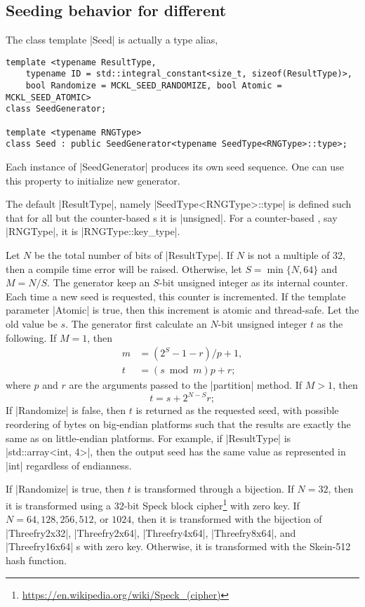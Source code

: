 \subsection{Seeding behavior for different \texorpdfstring{\rng}{RNG}}
\label{sub:Seeding behavior for different RNG}

The class template |Seed| is actually a type alias,
\begin{verbatim}
template <typename ResultType,
    typename ID = std::integral_constant<size_t, sizeof(ResultType)>,
    bool Randomize = MCKL_SEED_RANDOMIZE, bool Atomic = MCKL_SEED_ATOMIC>
class SeedGenerator;

template <typename RNGType>
class Seed : public SeedGenerator<typename SeedType<RNGType>::type>;
\end{verbatim}
Each instance of |SeedGenerator| produces its own seed sequence. One can use
this property to initialize new generator.

The default |ResultType|, namely |SeedType<RNGType>::type| is defined such that
for all but the counter-based \rng{}s it is |unsigned|. For a counter-based
\rng{}, say |RNGType|, it is |RNGType::key_type|.

Let $N$ be the total number of bits of |ResultType|. If $N$ is not a multiple
of 32, then a compile time error will be raised. Otherwise, let $S =
\min\{N,64\}$ and $M = N / S$. The generator keep an $S$-bit unsigned integer
as its internal counter. Each time a new seed is requested, this counter is
incremented. If the template parameter |Atomic| is true, then this increment is
atomic and thread-safe. Let the old value be $s$. The generator first calculate
an $N$-bit unsigned integer $t$ as the following. If $M = 1$, then
\begin{align*}
  m &= (2^S - 1 - r)/p + 1, \\
  t &= (s \bmod m) p + r;
\end{align*}
where $p$ and $r$ are the arguments passed to the |partition| method. If $M >
1$, then
\begin{equation*}
  t = s + 2^{N - S}r;
\end{equation*}
If |Randomize| is false, then $t$ is returned as the requested seed, with
possible reordering of bytes on big-endian platforms such that the results are
exactly the same as on little-endian platforms. For example, if |ResultType| is
|std::array<int, 4>|, then the output seed has the same value as represented in
|int| regardless of endianness.

If |Randomize| is true, then $t$ is transformed through a bijection. If $N =
32$, then it is transformed using a 32-bit Speck block
cipher\footnote{\url{https://en.wikipedia.org/wiki/Speck_(cipher)}} with zero
key. If $N = 64, 128, 256, 512$, or $1024$, then it is transformed with the
bijection of |Threefry2x32|, |Threefry2x64|, |Threefry4x64|, |Threefry8x64|,
and |Threefry16x64| \rng{}s with zero key. Otherwise, it is transformed with
the Skein-512 hash function.

